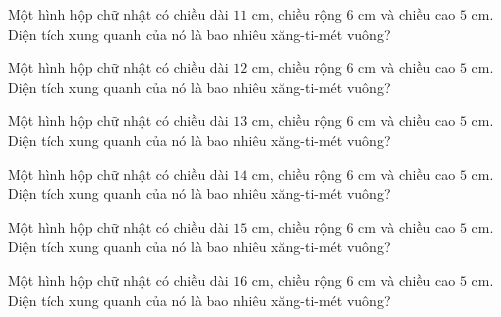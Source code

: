 
\begin{ex}
  Một hình hộp chữ nhật có chiều dài $11\text{ cm}$, chiều rộng $6\text{ cm}$ và chiều cao $5\text{ cm}$. Diện tích xung quanh của nó là bao nhiêu xăng-ti-mét vuông?
\end{ex}

\begin{ex}
  Một hình hộp chữ nhật có chiều dài $12\text{ cm}$, chiều rộng $6\text{ cm}$ và chiều cao $5\text{ cm}$. Diện tích xung quanh của nó là bao nhiêu xăng-ti-mét vuông?
\end{ex}

\begin{ex}
  Một hình hộp chữ nhật có chiều dài $13\text{ cm}$, chiều rộng $6\text{ cm}$ và chiều cao $5\text{ cm}$. Diện tích xung quanh của nó là bao nhiêu xăng-ti-mét vuông?
\end{ex}

\begin{ex}
  Một hình hộp chữ nhật có chiều dài $14\text{ cm}$, chiều rộng $6\text{ cm}$ và chiều cao $5\text{ cm}$. Diện tích xung quanh của nó là bao nhiêu xăng-ti-mét vuông?
\end{ex}

\begin{ex}
  Một hình hộp chữ nhật có chiều dài $15\text{ cm}$, chiều rộng $6\text{ cm}$ và chiều cao $5\text{ cm}$. Diện tích xung quanh của nó là bao nhiêu xăng-ti-mét vuông?
\end{ex}

\begin{ex}
  Một hình hộp chữ nhật có chiều dài $16\text{ cm}$, chiều rộng $6\text{ cm}$ và chiều cao $5\text{ cm}$. Diện tích xung quanh của nó là bao nhiêu xăng-ti-mét vuông?
\end{ex}

